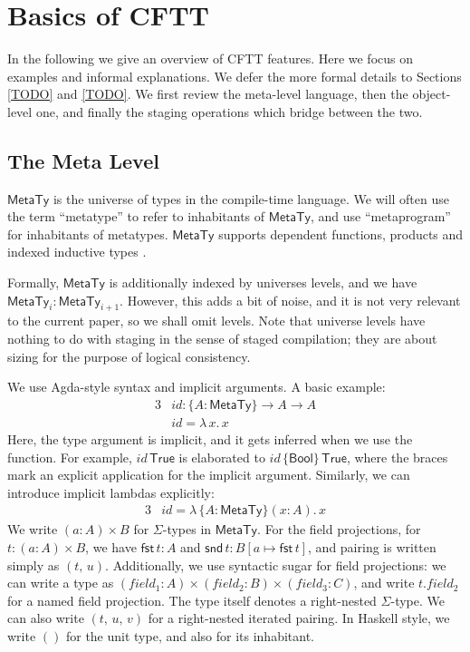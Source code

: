 \documentclass[acmsmall,screen,review,anonymous]{acmart}
\newcommand{\msf}[1]{\mathsf{#1}}
\newcommand{\bs}[1]{\boldsymbol{#1}}
\newcommand{\lam}{\lambda\,}
\newcommand{\Bool}{\msf{Bool}}
\newcommand{\MTy}{\msf{MetaTy}}
\newcommand{\True}{\msf{True}}
\newcommand{\fst}{\msf{fst}}
\newcommand{\snd}{\msf{snd}}
\begin{document}


\section{Basics of CFTT}\label{sec:basics-of-cftt}

In the following we give an overview of CFTT features. Here we focus on examples
and informal explanations. We defer the more formal details to Sections
\ref{TODO} and \ref{TODO}. We first review the meta-level language, then the
object-level one, and finally the staging operations which bridge between the
two.

\subsection{The Meta Level}\label{sec:the-meta-level}

$\bs{\MTy}$ is the universe of types in the compile-time language. We will often
use the term ``metatype'' to refer to inhabitants of $\MTy$, and use
``metaprogram'' for inhabitants of metatypes. $\MTy$ supports dependent
functions, products and indexed inductive types \cite{TODO}.

Formally, $\MTy$ is additionally indexed by universes levels, and we have
$\MTy_i : \MTy_{i+1}$. However, this adds a bit of noise, and it is not very
relevant to the current paper, so we shall omit levels. Note that universe
levels have nothing to do with staging in the sense of staged compilation; they
are about sizing for the purpose of logical consistency.

We use Agda-style syntax and implicit arguments. A basic example:
\begin{alignat*}{3}
  &id : \{A : \MTy\} \to A \to A\\
  &id = \lam x.\, x
\end{alignat*}
Here, the type argument is implicit, and it gets inferred when we use the
function. For example, $id\,\True$ is elaborated to $id\,\{\Bool\}\,\True$,
where the braces mark an explicit application for the implicit argument.
Similarly, we can introduce implicit lambdas explicitly:
\begin{alignat*}{3}
  &id = \lam \{A : \MTy\}(x : A).\,x
\end{alignat*}
We write $(a : A) \times B$ for $\Sigma$-types in $\MTy$. For the field
projections, for $t : (a : A) \times B$, we have $\fst\,t : A$ and $\snd\,t :
B[a \mapsto \fst\,t]$, and pairing is written simply as $(t,\,u)$. Additionally,
we use syntactic sugar for field projections: we can write a type as $(field_1 :
A) \times (field_2 : B) \times (field_3 : C)$, and write $t.field_2$ for a named
field projection. The type itself denotes a right-nested $\Sigma$-type. We can
also write $(t,\,u,\,v)$ for a right-nested iterated pairing. In Haskell style,
we write $()$ for the unit type, and also for its inhabitant.
\end{document}
